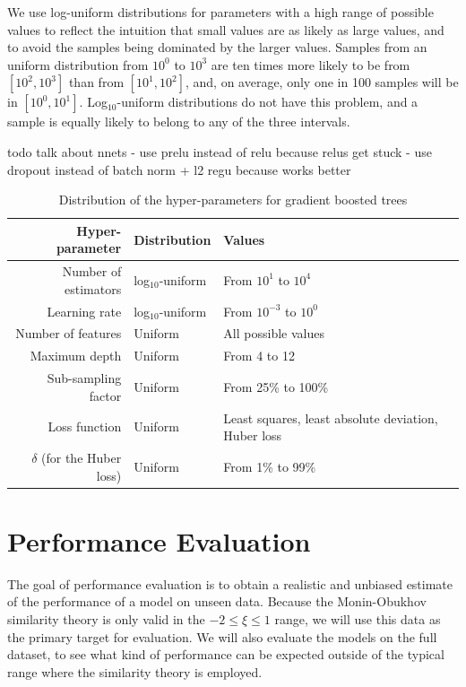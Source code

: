 \documentclass[12pt]{book}
\begin{document}
We use log-uniform distributions for parameters with a high range of possible values to reflect the intuition that small values are as likely as large values, and to avoid the samples being dominated by the larger values. Samples from an uniform distribution from $10^0$ to $10^3$ are ten times more likely to be from $[10^2,10^3]$ than from $[10^1,10^2]$, and, on average, only one in 100 samples will be in $[10^0,10^1]$. Log$_{10}$-uniform distributions do not have this problem, and a sample is equally likely to belong to any of the three intervals.

todo talk about nnets
 - use prelu instead of relu because relus get stuck
 - use dropout instead of batch norm + l2 regu because works better

\begin{table}[]
\centering
\caption{Distribution of the hyper-parameters for gradient boosted trees}
\label{tbl:gb_hyperparams}
\begin{tabularx}{\textwidth}{r|l|X}
\textbf{Hyper-parameter} & \textbf{Distribution} & \textbf{Values} \\ \hline
Number of estimators & log$_{10}$-uniform & From $10^1$ to $10^4$ \\
Learning rate & log$_{10}$-uniform & From $10^{-3}$ to $10^0$ \\
Number of features & Uniform & All possible values \\
Maximum depth & Uniform & From 4 to 12 \\
Sub-sampling factor & Uniform & From 25\% to 100\% \\
Loss function & Uniform & Least squares, least absolute deviation, \newline Huber loss \\
$\delta$ (for the Huber loss) & Uniform & From 1\% to 99\%
\end{tabularx}
\end{table}



\section{Performance Evaluation}
\label{sec:perf_eval}
The goal of performance evaluation is to obtain a realistic and unbiased estimate of the performance of a model on unseen data. Because the Monin-Obukhov similarity theory is only valid in the $-2\leq\xi\leq1$ range, we will use this data as the primary target for evaluation. We will also evaluate the models on the full dataset, to see what kind of performance can be expected outside of the typical range where the similarity theory is employed.
\end{document}
